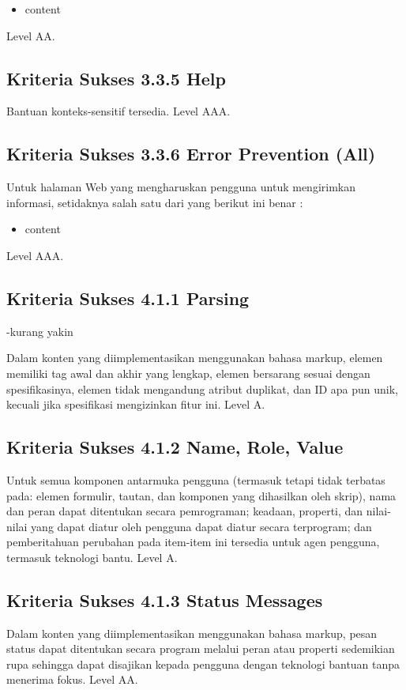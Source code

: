 \begin{itemize}
	\item content
\end{itemize}

Level AA.

\subsection{Kriteria Sukses 3.3.5 Help}
\label{sec:kriteria_3.3.5}
Bantuan konteks-sensitif tersedia.
Level AAA.

\subsection{Kriteria Sukses 3.3.6 Error Prevention (All)}
\label{sec:kriteria_3.3.6}
Untuk halaman Web yang mengharuskan pengguna untuk mengirimkan informasi, setidaknya salah satu dari yang berikut ini benar :

\begin{itemize}
	\item content
\end{itemize}

Level AAA.

\subsection{Kriteria Sukses 4.1.1 Parsing}
\label{sec:kriteria_4.1.1}
-kurang yakin

Dalam konten yang diimplementasikan menggunakan bahasa markup, elemen memiliki tag awal dan akhir yang lengkap, elemen bersarang sesuai dengan spesifikasinya, elemen tidak mengandung atribut duplikat, dan ID apa pun unik, kecuali jika spesifikasi mengizinkan fitur ini.
Level A.

\subsection{Kriteria Sukses 4.1.2 Name, Role, Value}
\label{sec:kriteria_4.1.2}
Untuk semua komponen antarmuka pengguna (termasuk tetapi tidak terbatas pada: elemen formulir, tautan, dan komponen yang dihasilkan oleh skrip), nama dan peran dapat ditentukan secara pemrograman; keadaan, properti, dan nilai-nilai yang dapat diatur oleh pengguna dapat diatur secara terprogram; dan pemberitahuan perubahan pada item-item ini tersedia untuk agen pengguna, termasuk teknologi bantu.
Level A.

\subsection{Kriteria Sukses 4.1.3 Status Messages}
\label{sec:kriteria_4.1.3}
Dalam konten yang diimplementasikan menggunakan bahasa markup, pesan status dapat ditentukan secara program melalui peran atau properti sedemikian rupa sehingga dapat disajikan kepada pengguna dengan teknologi bantuan tanpa menerima fokus.
Level AA.

